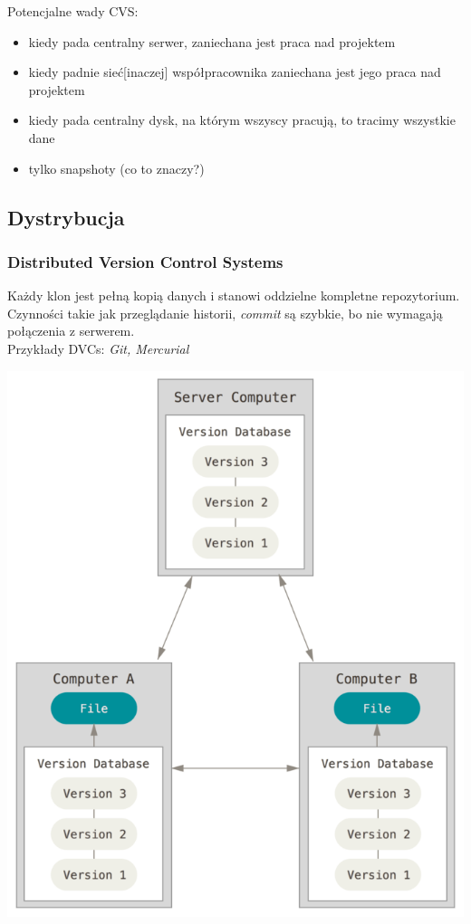 \documentclass{beamer}
\begin{document}
\begin{frame}
  Potencjalne wady CVS:\@
  \begin{itemize}
  \item kiedy pada centralny serwer, zaniechana jest praca nad projektem
  \item kiedy padnie sieć[inaczej] współpracownika zaniechana jest jego praca nad projektem
  \item kiedy pada centralny dysk, na którym wszyscy pracują, to tracimy wszystkie dane 
  \item tylko snapshoty (co to znaczy?)
 \end{itemize}
\end{frame}

\subsection{Dystrybucja}
\begin{frame}
 \frametitle{\textbf{D}istributed \textbf{V}ersion \textbf{C}ontrol \textbf{S}ystems}
  Każdy klon jest pełną kopią danych i stanowi oddzielne kompletne repozytorium.\\
  Czynności takie jak przeglądanie historii, \textit{commit} są szybkie, bo nie wymagają połączenia z serwerem.
\\
 Przykłady DVCs: \textit{Git, Mercurial}
\end{frame}

\begin{frame}
  \begin{center}
   \includegraphics[height=0.7\textwidth]{./obrazki/fig-1_3.png}
 \end{center} 
\end{frame}
\end{document}
